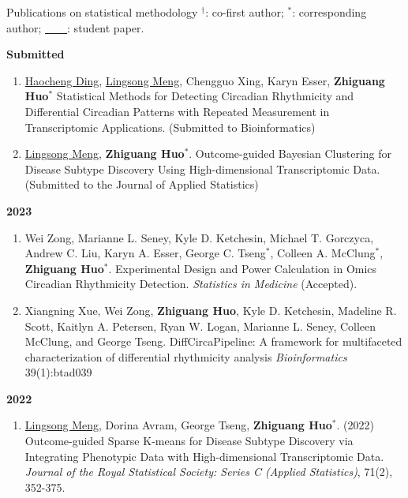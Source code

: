 \documentclass{resume} %
\begin{document}
\begin{rSection}{Publications on statistical methodology}
$^\dagger$: co-first author; $^*$: corresponding author; \underline{\mbox{ }\mbox{ }\mbox{ }\mbox{ }}: student paper.

\textbf{Submitted}
\begin{enumerate}[noitemsep,topsep=0pt]

\item \underline{Haocheng Ding}, \underline{Lingsong Meng}, Chengguo Xing, Karyn Esser, {\bf Zhiguang Huo}$^*$
Statistical Methods for Detecting Circadian Rhythmicity and Differential Circadian Patterns with Repeated Measurement in Transcriptomic Applications.
(Submitted to Bioinformatics)
\item 
\underline{Lingsong Meng}, {\bf Zhiguang Huo}$^*$. Outcome-guided Bayesian Clustering for Disease Subtype Discovery Using High-dimensional Transcriptomic Data. 
(Submitted to the Journal of Applied Statistics)
\end{enumerate}


\textbf{2023}
\begin{enumerate}[noitemsep,topsep=0pt, resume]

\item
Wei Zong, Marianne L. Seney, Kyle D. Ketchesin, Michael T. Gorczyca, Andrew C. Liu, Karyn A. Esser, George C. Tseng$^*$, Colleen A. McClung$^*$,  {\bf Zhiguang Huo}$^*$. 
Experimental Design and Power Calculation in Omics Circadian Rhythmicity Detection. 
\emph{Statistics in Medicine} (Accepted). 

\label{genstat_18} 
\label{soft_11} 


\item Xiangning Xue, Wei Zong, {\bf Zhiguang Huo}, Kyle D. Ketchesin, Madeline R. Scott, Kaitlyn A. Petersen, Ryan W. Logan, Marianne L. Seney, Colleen McClung, and George Tseng.
DiffCircaPipeline: A framework for multifaceted characterization of differential rhythmicity analysis
\emph{Bioinformatics} 39(1):btad039

\label{genstat_17} 
\label{soft_10} 

\end{enumerate}



\textbf{2022}
\begin{enumerate}[noitemsep,topsep=0pt, resume]

\item
\underline{Lingsong Meng}, Dorina Avram, George Tseng, {\bf Zhiguang Huo}$^*$.  (2022)
Outcome-guided Sparse K-means for Disease Subtype Discovery via Integrating Phenotypic Data with High-dimensional Transcriptomic Data.
\emph{Journal of the Royal Statistical Society: Series C (Applied Statistics)}, 71(2), 352-375.


\end{enumerate}
\end{rSection}
\end{document}
